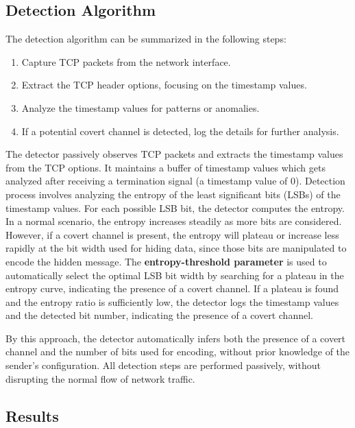 \documentclass[10pt,a4paper]{article}
\begin{document}
\subsection*{Detection Algorithm}
The detection algorithm can be summarized in the following steps:
\begin{enumerate}
    \item Capture TCP packets from the network interface.
    \item Extract the TCP header options, focusing on the timestamp values.
    \item Analyze the timestamp values for patterns or anomalies.
    \item If a potential covert channel is detected, log the details for further analysis.
\end{enumerate}

The detector passively observes TCP packets and extracts the timestamp values from the TCP options. 
It maintains a buffer of timestamp values which gets analyzed after receiving a termination signal (a timestamp value of 0).
Detection process involves analyzing the entropy of the least significant bits (LSBs) of the timestamp values. 
For each possible LSB bit, the detector computes the entropy. In a normal scenario, the entropy increases steadily as more bits are considered.
However, if a covert channel is present, the entropy will plateau or increase less rapidly at the bit width used for hiding data, since those bits are manipulated to encode the hidden message.
The \textbf{entropy-threshold parameter} is used to automatically select the optimal LSB bit width by searching for a plateau in the entropy curve, indicating the presence of a covert channel.
If a plateau is found and the entropy ratio is sufficiently low, the detector logs the timestamp values and the detected bit number, indicating the presence of a covert channel.

By this approach, the detector automatically infers both the presence of a covert channel and the number of bits used for encoding, without prior knowledge of the sender's configuration.
All detection steps are performed passively, without disrupting the normal flow of network traffic.

\subsection*{Results}
\end{document}
